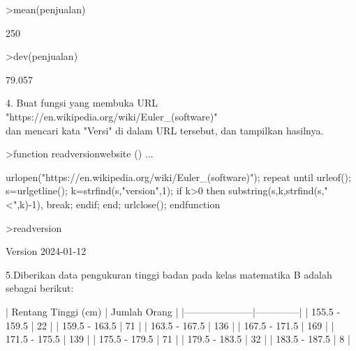 \documentclass[a4paper,10pt]{article}
\begin{document}
\begin{eulernotebook}
\begin{eulercomment}
\begin{eulercomment}
\begin{eulercomment}
\begin{eulercomment}
\begin{eulercomment}
\begin{eulercomment}
\begin{eulercomment}
\begin{eulercomment}
\begin{eulercomment}
\begin{eulercomment}
\begin{eulercomment}
\begin{eulercomment}
\begin{eulercomment}
\begin{eulercomment}
\begin{eulercomment}
\begin{eulercomment}
\begin{eulerprompt}
>mean(penjualan)
\end{eulerprompt}
\begin{euleroutput}
  250
\end{euleroutput}
\begin{eulerprompt}
>dev(penjualan)
\end{eulerprompt}
\begin{euleroutput}
  79.057
\end{euleroutput}
\begin{eulercomment}
4. Buat fungsi yang membuka URL\\
"https://en.wikipedia.org/wiki/Euler\_(software)"\\
dan mencari kata "Versi" di dalam URL tersebut, dan tampilkan
hasilnya.
\end{eulercomment}
\begin{eulerprompt}
>function readversionwebsite () ...
\end{eulerprompt}
\begin{eulerudf}
  urlopen("https://en.wikipedia.org/wiki/Euler_(software)");
  repeat
     until urleof();
     s=urlgetline();
     k=strfind(s,"version",1);
     if k>0 then substring(s,k,strfind(s,"<",k)-1), break; endif;
  end;
  urlclose();
  endfunction
\end{eulerudf}
\begin{eulerprompt}
>readversion
\end{eulerprompt}
\begin{euleroutput}
  Version 2024-01-12
\end{euleroutput}
\begin{eulercomment}
5.Diberikan data pengukuran tinggi badan pada kelas matematika B
adalah sebagai berikut:

\end{eulercomment}
\begin{eulerttcomment}
           | Rentang Tinggi (cm) | Jumlah Orang |
           |---------------------|--------------|
           | 155.5 - 159.5       |      22      |
           | 159.5 - 163.5       |      71      |
           | 163.5 - 167.5       |     136      |
           | 167.5 - 171.5       |     169      |
           | 171.5 - 175.5       |     139      |
           | 175.5 - 179.5       |      71      |
           | 179.5 - 183.5       |      32      |
           | 183.5 - 187.5       |       8      |
\end{eulerttcomment}
\begin{eulercomment}


\end{eulercomment}
\end{eulercomment}
\end{eulercomment}
\end{eulercomment}
\end{eulercomment}
\end{eulercomment}
\end{eulercomment}
\end{eulercomment}
\end{eulercomment}
\end{eulercomment}
\end{eulercomment}
\end{eulercomment}
\end{eulercomment}
\end{eulercomment}
\end{eulercomment}
\end{eulercomment}
\end{eulercomment}
\end{eulernotebook}
\end{document}
